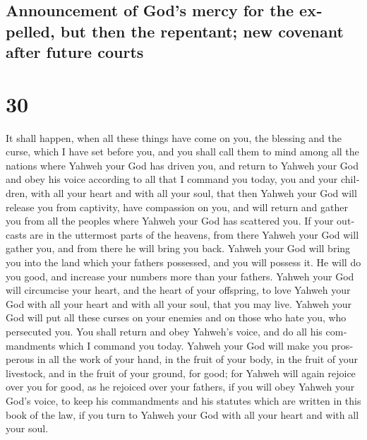 \begin{paracol}{2}
\switchcolumn
\begin{otherlanguage}{english}

\hypertarget{announcement-of-gods-mercy-for-the-expelled-but-then-the-repentant-new-covenant-after-future-courts}{%
\subsection{Announcement of God's mercy for the expelled, but then the
repentant; new covenant after future
courts}\label{announcement-of-gods-mercy-for-the-expelled-but-then-the-repentant-new-covenant-after-future-courts}}

\hypertarget{section-59}{%
\section{30}\label{section-59}}

 It shall happen, when all these things have come on you,
the blessing and the curse, which I have set before you, and you shall
call them to mind among all the nations where Yahweh your God has driven
you,  and return to Yahweh your God and obey his voice
according to all that I command you today, you and your children, with
all your heart and with all your soul,  that then Yahweh
your God will release you from captivity, have compassion on you, and
will return and gather you from all the peoples where Yahweh your God
has scattered you.  If your outcasts are in the uttermost
parts of the heavens, from there Yahweh your God will gather you, and
from there he will bring you back.  Yahweh your God will
bring you into the land which your fathers possessed, and you will
possess it. He will do you good, and increase your numbers more than
your fathers.  Yahweh your God will circumcise your heart,
and the heart of your offspring, to love Yahweh your God with all your
heart and with all your soul, that you may live.  Yahweh
your God will put all these curses on your enemies and on those who hate
you, who persecuted you.  You shall return and obey
Yahweh's voice, and do all his commandments which I command you today.
 Yahweh your God will make you prosperous in all the work
of your hand, in the fruit of your body, in the fruit of your livestock,
and in the fruit of your ground, for good; for Yahweh will again rejoice
over you for good, as he rejoiced over your fathers,  if
you will obey Yahweh your God's voice, to keep his commandments and his
statutes which are written in this book of the law, if you turn to
Yahweh your God with all your heart and with all your soul.


\end{otherlanguage}
\end{paracol}
